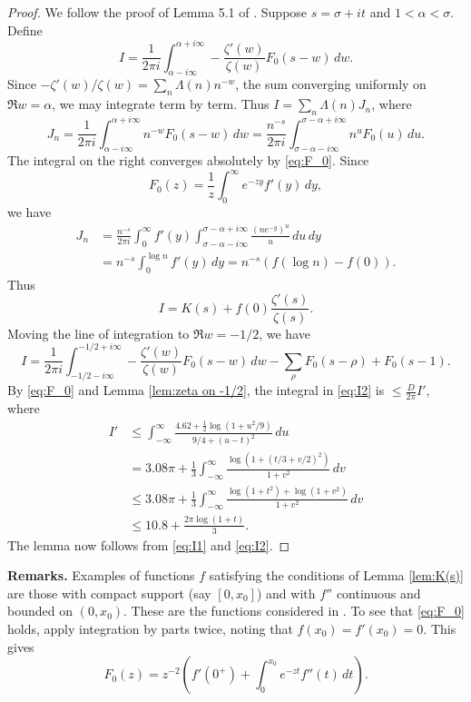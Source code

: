 \documentclass[10pt]{amsart}
\theoremstyle{remark}
\theoremstyle{plain}
\numberwithin{equation}{section}
\theoremstyle{definition}
\def\({\left(}
\def\){\right)}
\def\a{\alpha}
\begin{document}
\begin{proof}  We follow the proof of Lemma 5.1 of \cite{HB2}.  Suppose
$s=\sigma+it$ and $1 < \a  < \sigma$.  Define
$$
I = \frac{1}{2\pi i} \int_{\a-i\infty}^{\a+i\infty}-\frac{\zeta'(w)}{\zeta(w)}
F_0(s-w)\, dw.
$$
Since $-\zeta'(w)/\zeta(w)=\sum_n \Lambda(n) n^{-w}$, the sum converging
 uniformly on
$\Re w=\a$, we may integrate term by term.  Thus $I=\sum_n \Lambda(n) J_n$,
where
$$
J_n = \frac{1}{2\pi i}  \int_{\a-i\infty}^{\a+i\infty} n^{-w}
F_0(s-w)\, dw 
= \frac{n^{-s}}{2\pi i}  \int_{\sigma-\a-i\infty}^{\sigma-\a+i\infty} n^u
F_0(u)\, du.
$$
The integral on the right converges absolutely by \eqref{eq:F_0}.  Since
$$
F_0(z) = \frac1{z} \int_0^\infty e^{-zy} f'(y)\, dy,
$$
we have
\begin{align*}
J_n &= \frac{n^{-s}}{2\pi i} \int_0^\infty f'(y) 
 \int_{\sigma-\a-i\infty}^{\sigma-\a+i\infty} \frac{(ne^{-y})^u}{u}\,
du\, dy \\
&=  n^{-s} \int_0^{\log n} f'(y)\, dy =
 n^{-s} \( f(\log n)-f(0) \).
\end{align*}
Thus
\begin{equation}
I = K(s) +f(0) \frac{\zeta'(s)}{\zeta(s)}. \label{eq:I1}
\end{equation}
Moving the line of integration to $\Re w = -1/2$, we have
\begin{equation}
I = \frac{1}{2\pi i} \int_{-1/2-i\infty}^{-1/2+i\infty} 
- \frac{\zeta'(w)}{\zeta(w)} F_0(s-w)\, dw
- \sum_\rho F_0(s-\rho) + F_0(s-1). \label{eq:I2}
\end{equation}
By \eqref{eq:F_0} and Lemma \ref{lem:zeta on -1/2},
 the integral in \eqref{eq:I2} is $\le \frac{D}{2\pi}I'$, where
\begin{align*}
I' &\le \int_{-\infty}^\infty \frac{4.62+\tfrac12 \log(1+u^2/9)}
  {9/4+(u-t)^2}\, du \\
&= 3.08\pi + \frac13 \int_{-\infty}^\infty \frac{\log(1+(t/3+v/2)^2)}{1+v^2}\,
   dv \\
&\le 3.08\pi + \frac13 \int_{-\infty}^\infty \frac{\log(1+t^2)+\log(1+v^2)}
  {1+v^2}\, dv \\
&\le 10.8 + \frac{2\pi \log(1+t)}{3}.
\end{align*}
The lemma now follows from \eqref{eq:I1} and \eqref{eq:I2}.
\end{proof}

{\bf Remarks.}  Examples of functions $f$ satisfying the conditions
of Lemma \ref{lem:K(s)}
are those with compact support (say $[0,x_0]$) and with $f''$ 
continuous and bounded on $(0,x_0)$.
These are the functions considered in \cite{HB2}.
To see that \eqref{eq:F_0}
holds, apply integration by parts twice, noting that
$f(x_0)=f'(x_0)=0$.  This gives
$$
F_0(z) = z^{-2} \( f'(0^+) + \int_0^{x_0} e^{-zt} f''(t)\, dt\).
$$
\end{document}
